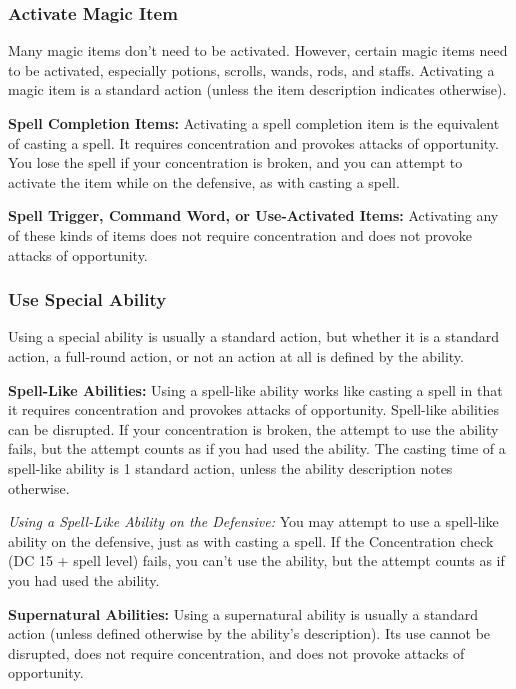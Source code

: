 \documentclass{article}
\begin{document}
\vspace{12pt}
\subsubsection*{\textbf{Activate Magic Item}}

Many magic items don't need to be activated. However, certain magic items need 
to be activated, especially potions, scrolls, wands, rods, and staffs. Activating 
a magic item is a standard action (unless the item description indicates otherwise).

\textbf{Spell Completion Items: }Activating a spell completion item is the equivalent 
of casting a spell. It requires concentration and provokes attacks of opportunity. 
You lose the spell if your concentration is broken, and you can attempt to activate 
the item while on the defensive, as with casting a spell.

\textbf{Spell Trigger, Command Word, or Use-Activated Items: }Activating any of 
these kinds of items does not require concentration and does not provoke attacks 
of opportunity.

\vspace{12pt}
\subsubsection*{\textbf{Use Special Ability}}

Using a special ability is usually a standard action, but whether it is a standard 
action, a full-round action, or not an action at all is defined by the ability.

\textbf{Spell-Like Abilities:} Using a spell-like ability works like casting a 
spell in that it requires concentration and provokes attacks of opportunity. Spell-like 
abilities can be disrupted. If your concentration is broken, the attempt to use 
the ability fails, but the attempt counts as if you had used the ability. The casting 
time of a spell-like ability is 1 standard action, unless the ability description 
notes otherwise.

\textit{Using a Spell-Like Ability on the Defensive: }You may attempt to use a 
spell-like ability on the defensive, just as with casting a spell. If the Concentration 
check (DC 15 + spell level) fails, you can't use the ability, but the attempt counts 
as if you had used the ability.

\textbf{Supernatural Abilities:} Using a supernatural ability is usually a standard 
action (unless defined otherwise by the ability's description). Its use cannot 
be disrupted, does not require concentration, and does not provoke attacks of opportunity.
\end{document}
